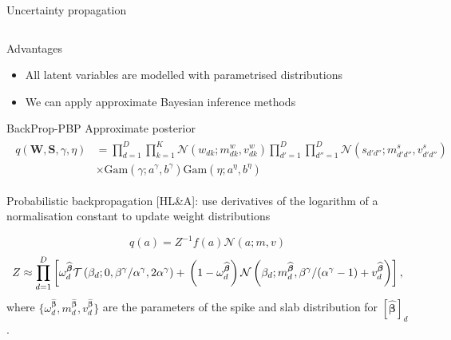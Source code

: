 \documentclass[9pt]{beamer}
\begin{document}
\begin{frame}{Uncertainty propagation}
\begin{columns}
\begin{column}{0.67\textwidth}
      \end{column}
    \end{columns}
  \begin{block}{Advantages}
    \begin{itemize}
      \item[] {\color{blue}All latent variables are modelled with parametrised distributions}
      \item[] {\color{blue}We can apply approximate Bayesian inference methods}
    \end{itemize}
  \end{block}
\end{frame}

\begin{frame}{BackProp-PBP}
  Approximate posterior
\begin{align*}
\label{eq:approximating_dsitribution}
\begin{split}
q(\mathbf{W}, \mathbf{S}, \gamma, \eta) &= \prod_{d=1}^D\prod_{k=1}^K \mathcal{N}(w_{dk} ; m^w_{dk}, v^w_{dk}) \prod_{d'=1}^D\prod_{d''=1}^D \mathcal{N}(s_{d'd''} ; m^s_{d'd''}, v^s_{d'd''}) \\
&\times \text{Gam}(\gamma; a^\gamma, b^\gamma) \text{Gam}(\eta; a^\eta, b^\eta)
\end{split}
\end{align*}

\begin{block}{}
  Probabilistic backpropagation [HL\&A]: use derivatives of the logarithm of a normalisation constant to update weight distributions
\end{block}
\begin{equation*}
q(a) = Z^{-1}f(a)\mathcal{N}(a; m, v)
\end{equation*}
\begin{equation*}
Z \approx \prod_{d=1}^D \left[\omega^{\widehat{\boldsymbol\beta}}_d  \mathcal{T}\left(\beta_d ; 0, \beta^\gamma / \alpha^\gamma, 2\alpha^\gamma\right) + \vphantom{m^{\widehat{\boldsymbol\beta}}_d} \left(1 - \omega^{\widehat{\boldsymbol\beta}}_d\right)\mathcal{N}\left(\beta_d ; m^{\widehat{\boldsymbol\beta}}_d,  \beta^\gamma / (\alpha^\gamma - 1) + v^{\widehat{\boldsymbol\beta}}_d\right)\right],
\end{equation*}
where $\{\omega^{\widehat{\boldsymbol\beta}}_d, m^{\widehat{\boldsymbol\beta}}_d, v^{\widehat{\boldsymbol\beta}}_d\}$ are the parameters of the spike and slab distribution for $[\widehat{\boldsymbol\beta}]_d$.

\end{frame}
\end{document}
